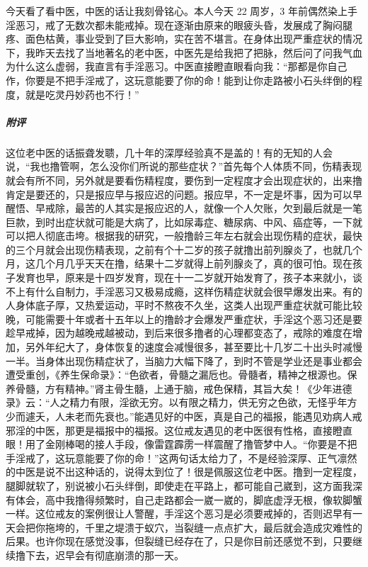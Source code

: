 \begin{case}
    今天看了看中医，中医的话让我刻骨铭心。本人今天 22 周岁，3 年前偶然染上手淫恶习，戒了无数次都未能戒掉。现在逐渐由原来的眼疲头昏，发展成了胸闷腿疼、面色枯黄，事业受到了巨大影响，实在苦不堪言。在身体出现严重症状的情况下，我昨天去找了当地著名的老中医，中医先是给我把了把脉，然后问了问我气血为什么这么虚弱，我直言有手淫恶习。中医直接瞪直眼看向我：“那都是你自己作，你要是不把手淫戒了，这玩意能要了你的命！能到让你走路被小石头绊倒的程度，就是吃灵丹妙药也不行！”
    \subparagraph{附评} 这位老中医的话振聋发聩，几十年的深厚经验真不是盖的！有的无知的人会说，“我也撸管啊，怎么没你们所说的那些症状？”首先每个人体质不同，伤精表现就会有所不同，另外就是要看伤精程度，要伤到一定程度才会出现症状的，出来撸肯定是要还的，只是报应早与报应迟的问题。报应早，不一定是坏事，因为可以早醒悟、早戒除，最苦的人其实是报应迟的人，就像一个人欠账，欠到最后就是一笔巨款，到时出症状就可能是大病了，比如尿毒症、糖尿病、中风、癌症等，一下就可以把人彻底击垮。根据我的研究，一般撸龄三年左右就会出现伤精的症状，最快的三个月就会出现伤精表现，之前有个十二岁的孩子就撸出前列腺炎了，也就几个月，这几个月几乎天天在撸，结果十二岁就得上前列腺炎了，真的很可怕。现在孩子发育也早，原来是十四岁发育，现在十一二岁就开始发育了，孩子本来就小，谈不上有什么自制力，手淫恶习又极易成瘾，这样伤精症状就会很早爆发出来。有的人身体底子厚，又热爱运动，平时不熬夜不久坐，这类人出现严重症状就可能比较晚，可能需要十年或者十五年以上的撸龄才会爆发严重症状，手淫这个恶习还是要趁早戒掉，因为越晚戒越被动，到后来很多撸者的心理都变态了，戒除的难度在增加，另外年纪大了，身体恢复的速度会减慢很多，甚至要比十几岁二十出头时减慢一半。当身体出现伤精症状了，当脑力大幅下降了，到时不管是学业还是事业都会遭受重创，《养生保命录》：“色欲者，骨髓之漏卮也。骨髓者，精神之根源也。保养骨髓，方有精神。”肾主骨生髓，上通于脑，戒色保精，其旨大矣！《少年进德录》云：“人之精力有限，淫欲无穷。以有限之精力，供无穷之色欲，无怪乎年方少而遽夭，人未老而先衰也。”能遇见好的中医，真是自己的福报，能遇见劝病人戒邪淫的中医，那更是福报中的福报。这位戒友遇见的老中医很有性格，直接瞪直眼！用了金刚棒喝的接人手段，像雷霆霹雳一样震醒了撸管梦中人。“你要是不把手淫戒了，这玩意能要了你的命！”这两句话太给力了，不是经验深厚、正气凛然的中医是说不出这种话的，说得太到位了！很是佩服这位老中医。撸到一定程度，腿脚就软了，别说被小石头绊倒，即使走在平路上，都可能自己崴到，这方面我深有体会，高中我撸得频繁时，自己走路都会一崴一崴的，脚底虚浮无根，像软脚蟹一样。这位戒友的案例很让人警醒，手淫这个恶习是必须要戒掉的，否则迟早有一天会把你拖垮的，千里之堤溃于蚁穴，当裂缝一点点扩大，最后就会造成灾难性的后果。也许你现在感觉没事，但裂缝已经存在了，只是你目前还感觉不到，只要继续撸下去，迟早会有彻底崩溃的那一天。
\end{case}

